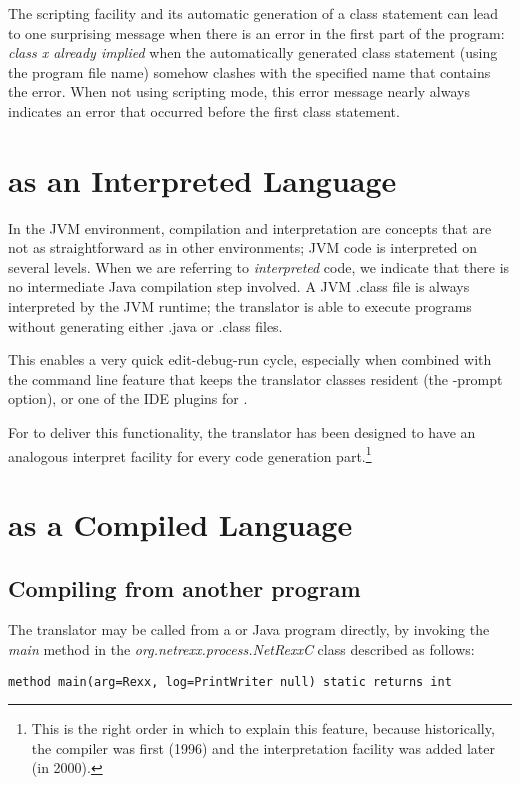 {The scripting facility and its automatic generation of a class
statement can lead to one surprising message when there is
an error in the first part of the program: \emph{class x already
  implied} when the automatically generated class statement (using the
program file name) somehow clashes with the specified name that
contains the error. When not using scripting mode, this error message
nearly always indicates an error that occurred before the first class statement.

\chapter{\nr{} as an Interpreted Language}\label{interpreted}
In the JVM environment, compilation and interpretation are concepts
that are not as straightforward as in other environments; JVM code is
interpreted on several levels. When we are referring to
\emph{interpreted} \nr{} code, we indicate that there is no
intermediate Java compilation step involved. A JVM .class file is
always interpreted by the JVM runtime; the \nr{} translator is able to
execute programs without generating either .java or .class files.

This enables a very quick edit-debug-run cycle, especially when
combined with the command line feature that keeps the translator
classes resident (the -prompt option), or one of the IDE plugins for
\nr{}.

For \nr{} to deliver this functionality, the translator has been
designed to have an analogous interpret facility for every code
generation part.\footnote{This is the right order in which to explain this
  feature, because historically, the compiler was first (1996) and the
  interpretation facility was added later (in 2000).}

\chapter{\nr{} as a Compiled Language}
\section{Compiling from another program}

The translator may be called from a \nr{}or Java program directly, by
invoking the \emph{main} method in the \emph{org.netrexx.process.NetRexxC}
class described as follows:

\begin{lstlisting}[label=ivmain,caption=Invoking NetRexxC.main]
method main(arg=Rexx, log=PrintWriter null) static returns int
\end{lstlisting}

}
